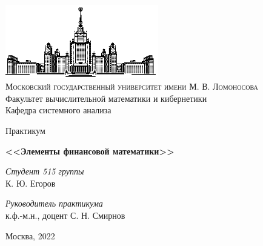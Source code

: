 \thispagestyle{empty}
\begin{center}
    \ \vspace{-3cm}

    \includegraphics[width=0.5\textwidth]{title_page/msu.eps}\\

    {\small{\scshape  Московский государственный университет имени М. В. Ломоносова}\\
    Факультет вычислительной математики и кибернетики\\
    Кафедра системного анализа}

    \vfill

    {\Large Практикум}

    \vspace{1cm}

    {\LARGE\bfseries <<Элементы финансовой математики>>}

    \vspace{1.5cm}

\end{center}

\vspace{3cm}

\begin{flushright}
    \large
    \textit{Студент 515 группы}\\
    К. Ю. Егоров

    \vspace{5mm}
    
    \textit{Руководитель практикума}\\
   к.ф.-м.н., доцент С. Н. Смирнов
\end{flushright}

\vfill

\begin{center}
    Москва, 2022
\end{center}

\clearpage